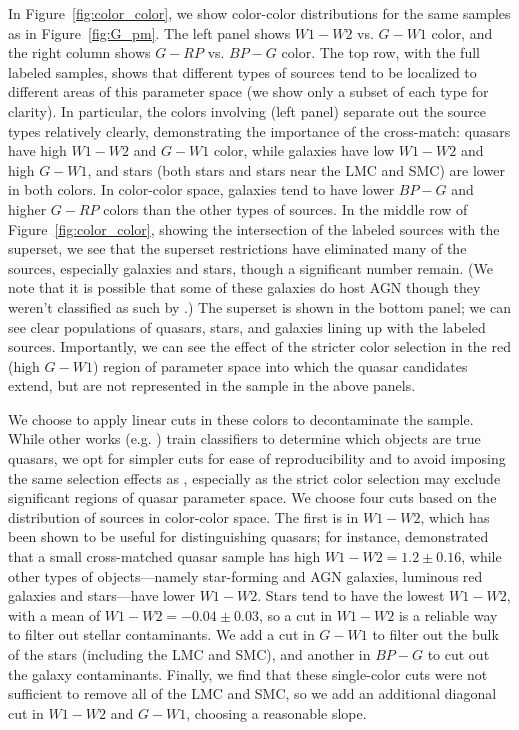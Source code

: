 In Figure~\ref{fig:color_color}, we show color-color distributions for the same samples as in Figure~\ref{fig:G_pm}.
The left panel shows $W1-W2$ vs. $G-W1$ color, and the right column shows $G-RP$ vs. $BP-G$ color.
The top row, with the full labeled samples, shows that different types of sources tend to be localized to different areas of this parameter space (we show only a subset of each type for clarity).
In particular, the colors involving \unWISE (left panel) separate out the source types relatively clearly, demonstrating the importance of the \unWISE cross-match: \SDSS quasars have high $W1-W2$ and $G-W1$ color, while galaxies have low $W1-W2$ and high $G-W1$, and stars (both \SDSS stars and stars near the LMC and SMC) are lower in both colors.
In \Gaia color-color space, galaxies tend to have lower $BP-G$ and higher $G-RP$ colors than the other types of sources.
In the middle row of Figure~\ref{fig:color_color}, showing the intersection of the labeled sources with the \cat superset, we see that the superset restrictions have eliminated many of the sources, especially \SDSS galaxies and stars, though a significant number remain.
(We note that it is possible that some of these \SDSS galaxies do host AGN though they weren't classified as such by \SDSS.)
The \cat superset is shown in the bottom panel; we can see clear populations of quasars, stars, and galaxies lining up with the labeled sources.
Importantly, we can see the effect of the stricter \SDSS color selection in the red (high $G-W1$) region of parameter space into which the \Gaia quasar candidates extend, but are not represented in the \SDSS sample in the above panels.

We choose to apply linear cuts in these colors to decontaminate the sample.
While other works (e.g. \citealt{hughes_quasar_2022}) train classifiers to determine which objects are true quasars, we opt for simpler cuts for ease of reproducibility and to avoid imposing the same selection effects as \SDSS, especially as the strict \SDSS color selection may exclude significant regions of quasar parameter space.
We choose four cuts based on the distribution of sources in color-color space. 
The first is in $W1-W2$, which has been shown to be useful for distinguishing quasars; for instance, \cite{nikutta_meaning_2014} demonstrated that a small cross-matched \SDSS quasar sample has high $W1-W2=1.2 \pm 0.16$, while other types of objects---namely star-forming and AGN galaxies, luminous red galaxies and stars---have lower $W1-W2$.
Stars tend to have the lowest $W1-W2$, with a mean of $W1-W2=-0.04 \pm 0.03$, so a cut in $W1-W2$ is a reliable way to filter out stellar contaminants.
We add a cut in $G-W1$ to filter out the bulk of the stars (including the LMC and SMC), and another in $BP-G$ to cut out the galaxy contaminants.
Finally, we find that these single-color cuts were not sufficient to remove all of the LMC and SMC, so we add an additional diagonal cut in $W1-W2$ and $G-W1$, choosing a reasonable slope.

